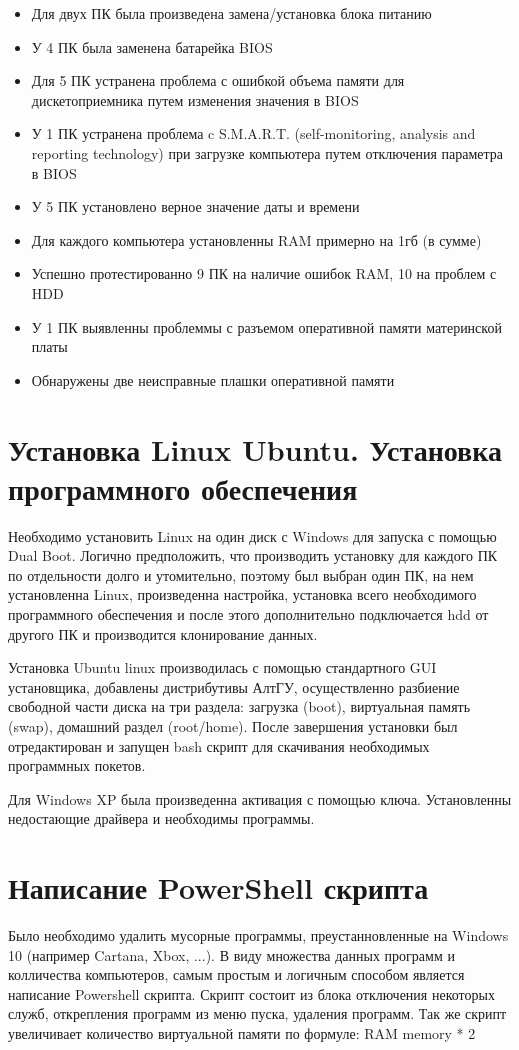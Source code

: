 \documentclass[a4paper, 12pt]{article}
\begin{document}
\begin{itemize}
  \item Для двух ПК была произведена замена/установка блока питанию
  \item У 4 ПК была заменена батарейка BIOS
  \item Для 5 ПК устранена проблема с ошибкой объема памяти для дискетоприемника путем изменения значения в BIOS
  \item У 1 ПК устранена проблема c S.M.A.R.T. (self-monitoring, analysis and reporting technology) при загрузке компьютера путем отключения параметра в BIOS
  \item У 5 ПК установлено верное значение даты и времени
  \item Для каждого компьютера установленны RAM примерно на 1гб (в сумме)
  \item Успешно протестированно 9 ПК на наличие ошибок RAM, 10 на проблем с HDD
  \item У 1 ПК выявленны проблеммы с разъемом оперативной памяти материнской платы
  \item Обнаружены две неисправные плашки оперативной памяти
\end{itemize}

\section{Установка Linux Ubuntu. Установка программного обеспечения}
Необходимо установить Linux на один диск с Windows для запуска с помощью Dual Boot. Логично предположить, что производить установку для каждого ПК по отдельности долго и утомительно, поэтому был выбран один ПК, на нем установленна Linux, произведенна настройка, установка всего необходимого программного обеспечения и после этого дополнительно подключается hdd от другого ПК и производится клонирование данных. 

Установка Ubuntu linux производилась с помощью стандартного GUI установщика, добавлены дистрибутивы АлтГУ, осуществленно разбиение свободной части диска на три раздела: загрузка (boot), виртуальная память (swap), домашний раздел (root/home). После завершения установки был отредактирован и запущен bash скрипт для скачивания необходимых программных покетов. 

Для Windows XP была произведенна активация с помощью ключа. Установленны недостающие драйвера и необходимы программы.

\section{Написание PowerShell скрипта}
Было необходимо удалить мусорные программы, преустанновленные на Windows 10 (например Cartana, Xbox, ...). В виду множества данных программ и колличества компьютеров, самым простым и логичным способом является написание Powershell скрипта. Скрипт состоит из блока отключения некоторых служб, открепления программ из меню пуска, удаления программ. Так же скрипт увеличивает количество виртуальной памяти по формуле: RAM memory * 2
\end{document}
